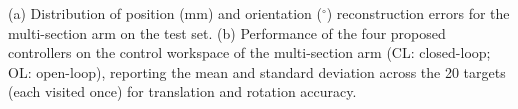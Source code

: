 \caption{(a) Distribution of position (mm) and orientation ($^\circ$) reconstruction errors for the multi-section arm on the test set. (b) Performance of the four proposed controllers on the control workspace of the multi-section arm (CL: closed-loop; OL: open-loop), reporting the mean and standard deviation across the 20 targets (each visited once) for translation and rotation accuracy.}
